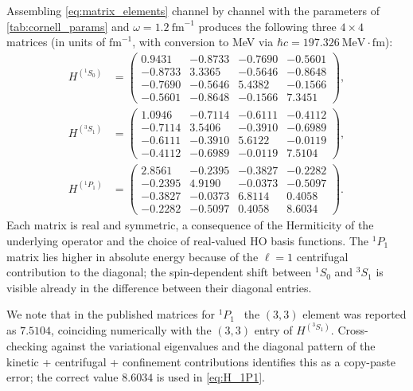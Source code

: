 Assembling \cref{eq:matrix_elements} channel by channel with the parameters
of \cref{tab:cornell_params} and $\omega = 1.2~\mathrm{fm}^{-1}$ produces the
following three $4\times 4$ matrices (in units of $\mathrm{fm}^{-1}$, with
conversion to MeV via $\hbar c = 197.326~\mathrm{MeV}\!\cdot\!\mathrm{fm}$):
\begin{align}
H^{({}^1S_0)} &= \begin{pmatrix}
   0.9431 & -0.8733 & -0.7690 & -0.5601\\
  -0.8733 &  3.3365 & -0.5646 & -0.8648\\
  -0.7690 & -0.5646 &  5.4382 & -0.1566\\
  -0.5601 & -0.8648 & -0.1566 &  7.3451
\end{pmatrix},
\label{eq:H_1S0}\\[4pt]
H^{({}^3S_1)} &= \begin{pmatrix}
   1.0946 & -0.7114 & -0.6111 & -0.4112\\
  -0.7114 &  3.5406 & -0.3910 & -0.6989\\
  -0.6111 & -0.3910 &  5.6122 & -0.0119\\
  -0.4112 & -0.6989 & -0.0119 &  7.5104
\end{pmatrix},
\label{eq:H_3S1}\\[4pt]
H^{({}^1P_1)} &= \begin{pmatrix}
   2.8561 & -0.2395 & -0.3827 & -0.2282\\
  -0.2395 &  4.9190 & -0.0373 & -0.5097\\
  -0.3827 & -0.0373 &  6.8114 &  0.4058\\
  -0.2282 & -0.5097 &  0.4058 &  8.6034
\end{pmatrix}.
\label{eq:H_1P1}
\end{align}
Each matrix is real and symmetric, a consequence of the Hermiticity of the
underlying operator and the choice of real-valued HO basis functions. The
${}^1P_1$ matrix lies higher in absolute energy because of the
$\ell=1$ centrifugal contribution to the diagonal; the spin-dependent shift
between ${}^1S_0$ and ${}^3S_1$ is visible already in the difference between
their diagonal entries.

\begin{remark}
We note that in the published matrices for ${}^1P_1$~\cite{woloshyn2023} the
$(3,3)$ element was reported as $7.5104$, coinciding numerically with the
$(3,3)$ entry of $H^{({}^3S_1)}$. Cross-checking against the variational
eigenvalues and the diagonal pattern of the kinetic + centrifugal +
confinement contributions identifies this as a copy-paste error; the correct
value $8.6034$ is used in \cref{eq:H_1P1}.
\end{remark}

